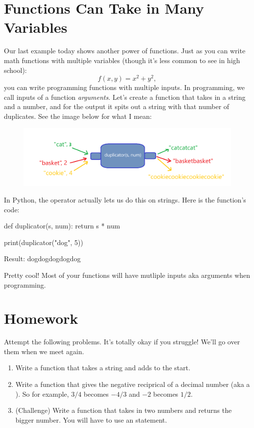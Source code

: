 \documentclass[12pt]{scrartcl}
\begin{document}
\section*{Functions Can Take in Many Variables}
Our last example today shows another power of functions. Just as you can write math functions with multiple variables (though it's less common to see in high school):
\[f(x,y) = x^2 + y^2,\]
you can write programming functions with multiple inputs. In programming, we call inputs of a function \textit{arguments}. Let's create a function that takes in a string and a number, and for the output it spits out a string with that number of duplicates. See the image below for what I mean:
\begin{figure}[H]
    \centering
    \includegraphics[scale=0.3]{Duplicator Function.png}
\end{figure}
In Python, the \pythonl{*} operator actually lets us do this on strings. Here is the function's code:
\begin{python}
    def duplicator(s, num):
        return s * num
    
    print(duplicator("dog", 5))
\end{python}
\begin{code}
    Result: dogdogdogdogdog
\end{code}
Pretty cool! Most of your functions will have mutliple inputs aka arguments when programming.

\newpage
\section*{Homework}
Attempt the following problems. It's totally okay if you struggle! We'll go over them when we meet again.
\begin{enumerate}
    \item Write a function that takes a string and adds  to the start.
    \item Write a function that gives the negative reciprical of a decimal number (aka a ). So for example, $3/4$ becomes $-4/3$ and $-2$ becomes $1/2$.
    \item (Challenge) Write a function that takes in two numbers and returns the bigger number. You will have to use an  statement.
\end{enumerate}
\end{document}
